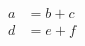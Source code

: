 \documentclass{article}
\begin{document}
\begin{align}
a &= b + c \\
d &= e + f
\end{align}
\end{document}
